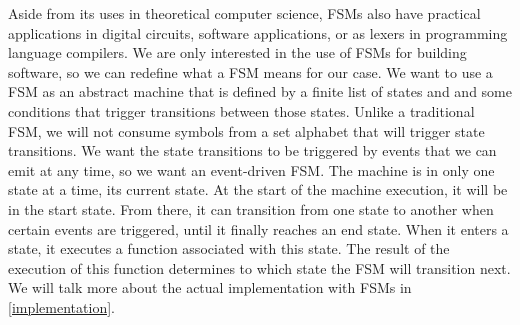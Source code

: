 Aside from its uses in theoretical computer science, FSMs also have practical applications in digital circuits, software applications, or as lexers in programming language compilers.
We are only interested in the use of FSMs for building software, so we can redefine what a FSM means for our case.
We want to use a FSM as an abstract machine that is defined by a finite list of states and and some conditions that trigger transitions between those states.
Unlike a traditional FSM, we will not consume symbols from a set alphabet that will trigger state transitions.
We want the state transitions to be triggered by events that we can emit at any time, so we want an event-driven FSM.
The machine is in only one state at a time, its current state.
At the start of the machine execution, it will be in the start state.
From there, it can transition from one state to another when certain events are triggered, until it finally reaches an end state.
When it enters a state, it executes a function associated with this state.
The result of the execution of this function determines to which state the FSM will transition next.
We will talk more about the actual implementation with FSMs in \autoref{implementation}.
